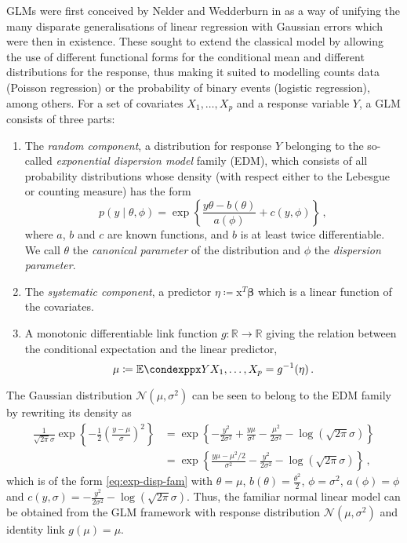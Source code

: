 \documentclass[a4paper]{book}
\begin{document}
GLMs were first conceived by Nelder and Wedderburn in \cite{nelder} as a way of unifying the many disparate generalisations of linear regression with Gaussian errors which were then in existence. These sought to extend the classical model by allowing the use of different functional forms for the conditional mean and different distributions for the response, thus making it suited to modelling counts data (Poisson regression) or the probability of binary events (logistic regression), among others. For a set of covariates $X_1, \dots, X_p$ and a response variable $Y$, a GLM consists of three parts:
\begin{enumerate}
  \item The \emph{random component}, a distribution for response $Y$ belonging to the so-called \emph{exponential dispersion model} family (EDM), which consists of all probability distributions whose density (with respect either to the Lebesgue or counting measure) has the form
        \begin{equation} \label{eq:exp-disp-fam}
          p(y \mid \theta, \phi) = \exp \left \{ \frac{y \theta - b(\theta)}{a(\phi)} + c(y, \phi) \right \} \,,
        \end{equation}
        where $a$, $b$ and $c$ are known functions, and $b$ is at least twice differentiable. We call $\theta$ the \emph{canonical parameter} of the distribution and $\phi$ the \emph{dispersion parameter}.
  \item The \emph{systematic component}, a predictor $\eta \coloneqq \bm{\mathrm{x}}^T \bm{\beta}$ which is a linear function of the covariates.
  \item A monotonic differentiable link function $g: \mathbb{R} \rightarrow \mathbb{R}$ giving the relation between the conditional expectation and the linear predictor,
        \begin{equation}
          \mu \coloneqq \condexpp{Y}{X_1, \dots, X_p} = g^{-1}(\eta) \,.
        \end{equation}
\end{enumerate}
The Gaussian distribution $\mathcal{N}(\mu, \sigma^2)$ can be seen to belong to the EDM family by rewriting its density as
\begin{align}
  \frac{1}{\sqrt{2 \pi} \sigma} \exp \left \{ -\frac{1}{2} \left( \frac{y - \mu}{\sigma} \right)^2\right \} & = \exp \left \{ -\frac{y^2}{2 \sigma^2} + \frac{y \mu}{\sigma^2} - \frac{\mu^2}{2 \sigma^2} - \log(\sqrt{2 \pi} \sigma) \right \} \\
                                                                                                            & = \exp \left \{ \frac{y \mu - \mu^2 / 2}{\sigma^2} - \frac{y^2}{2 \sigma^2} - \log(\sqrt{2 \pi} \sigma) \right \} \,,
\end{align}
which is of the form \cref{eq:exp-disp-fam} with $\theta = \mu$, $b(\theta) = \frac{\theta^2}{2}$, $\phi = \sigma^2$, $a(\phi) = \phi$ and $c(y, \sigma) = -\frac{y^2}{2 \sigma^2} - \log(\sqrt{2 \pi} \sigma)$. Thus, the familiar normal linear model can be obtained from the GLM framework with response distribution $\mathcal{N}(\mu, \sigma^2)$ and identity link $g(\mu) = \mu$.
\end{document}
